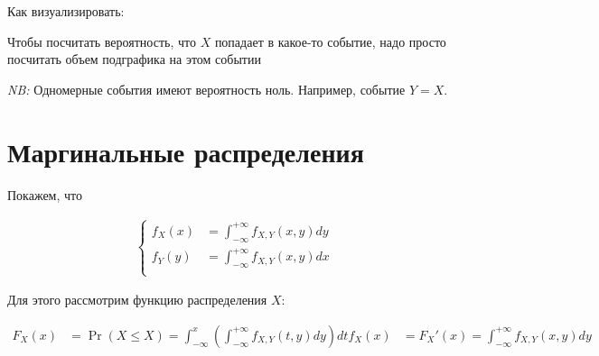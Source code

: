 \documentclass[12pt]{article}
\begin{document}
Как визуализировать:

\begin{center}
\end{center}

Чтобы посчитать вероятность, что $X$ попадает в какое-то событие, надо просто посчитать объем подграфика на этом событии

\emph{NB:} Одномерные события имеют вероятность ноль. Например, событие $Y = X$.

\section{Маргинальные распределения}
 Покажем, что 

 \begin{align*}
   \begin{cases}
    f_X(x) &= \int_{-\infty}^{+\infty} f_{X, Y}(x, y) dy \\
    f_Y(y) &= \int_{-\infty}^{+\infty} f_{X, Y}(x, y) dx \\
   \end{cases}
 \end{align*}

 Для этого рассмотрим функцию распределения $X$:

\begin{align*}
  F_X(x) &= \Pr(X \le X) = \int_{-\infty}^x \left(\int_{-\infty}^{+\infty} f_{X, Y} (t, y) dy\right) dt 
  f_X(x) &= F_X'(x) = \int_{-\infty}^{+\infty} f_{X, Y} (x, y) dy
\end{align*}
\end{document}
